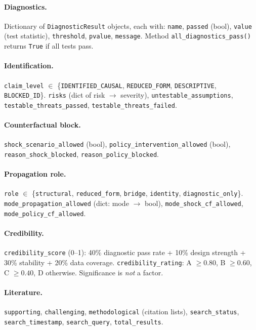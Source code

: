 \documentclass{article}
\begin{document}
\paragraph{Diagnostics.} Dictionary of \texttt{DiagnosticResult} objects, each with: \texttt{name}, \texttt{passed} (bool), \texttt{value} (test statistic), \texttt{threshold}, \texttt{pvalue}, \texttt{message}. Method \texttt{all\_diagnostics\_pass()} returns \texttt{True} if all tests pass.

\paragraph{Identification.} \texttt{claim\_level} $\in$ \{\texttt{IDENTIFIED\_CAUSAL}, \texttt{REDUCED\_FORM}, \texttt{DESCRIPTIVE}, \texttt{BLOCKED\_ID}\}. \texttt{risks} (dict of risk $\to$ severity), \texttt{untestable\_assumptions}, \texttt{testable\_threats\_passed}, \texttt{testable\_threats\_failed}.

\paragraph{Counterfactual block.} \texttt{shock\_scenario\_allowed} (bool), \texttt{policy\_intervention\_allowed} (bool), \texttt{reason\_shock\_blocked}, \texttt{reason\_policy\_blocked}.

\paragraph{Propagation role.} \texttt{role} $\in$ \{\texttt{structural}, \texttt{reduced\_form}, \texttt{bridge}, \texttt{identity}, \texttt{diagnostic\_only}\}. \texttt{mode\_propagation\_allowed} (dict: mode $\to$ bool), \texttt{mode\_shock\_cf\_allowed}, \texttt{mode\_policy\_cf\_allowed}.

\paragraph{Credibility.} \texttt{credibility\_score} (0--1): 40\% diagnostic pass rate + 10\% design strength + 30\% stability + 20\% data coverage. \texttt{credibility\_rating}: A $\geq 0.80$, B $\geq 0.60$, C $\geq 0.40$, D otherwise. Significance is \emph{not} a factor.

\paragraph{Literature.} \texttt{supporting}, \texttt{challenging}, \texttt{methodological} (citation lists), \texttt{search\_status}, \texttt{search\_timestamp}, \texttt{search\_query}, \texttt{total\_results}.
\end{document}
